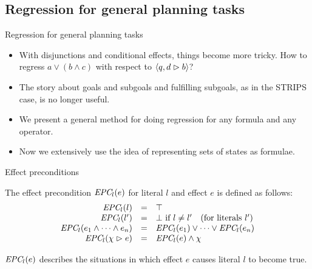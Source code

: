 \documentclass{gkibeamer}
\begin{document}
\subsection[General case]{Regression for general planning tasks}

\begin{frame}{Regression for general planning tasks}
  \begin{itemize}
  \item With disjunctions and conditional effects, things become more
    tricky. How to regress $a \lor (b \land c)$ with respect to $\langle
    q, d \vartriangleright b\rangle$?
  \item The story about goals and subgoals and fulfilling subgoals, as
    in the STRIPS case, is no longer useful.
  \item We present a general method for doing regression for any
    formula and any operator.
  \item Now we extensively use the idea of representing sets of states
    as formulae.
  \end{itemize}
\end{frame}

\begin{frame}{Effect preconditions}
  \begin{definition}
    The \alert{effect precondition $\textit{EPC}_{l}(e)$} for literal $l$
    and effect $e$ is defined as follows:
    \[
      \begin{array}{rcl}
        \textit{EPC}_{l}(l) & = & \top \\
        \textit{EPC}_{l}(l') & = & \bot \text{~if~} l \neq l'
        \quad(\text{for literals~} l') \\
        \textit{EPC}_{l}(e_1 \land \dots \land e_n) & = &
        \textit{EPC}_{l}(e_1) \lor \dots \lor \textit{EPC}_{l}(e_n) \\
        \textit{EPC}_{l}(\chi \vartriangleright e) & = & \textit{EPC}_{l}(e) \land \chi \\
      \end{array}
    \]
  \end{definition}
   $\textit{EPC}_{l}(e)$ describes the situations in which
  effect $e$ causes literal $l$ to become true.
\end{frame}
\end{document}
